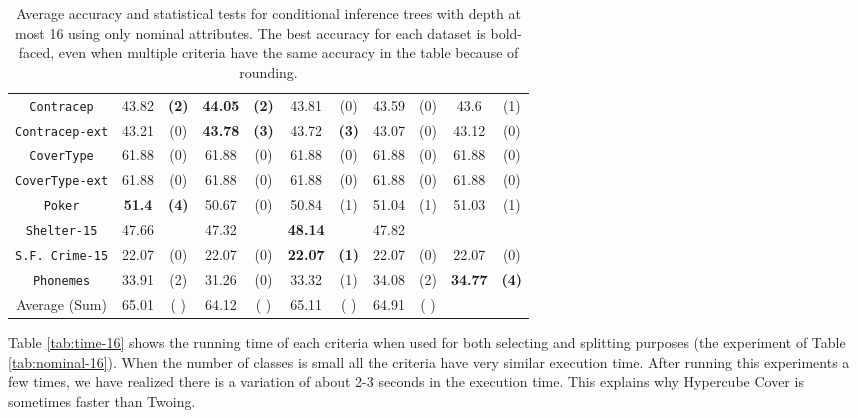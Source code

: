 \begin{table}
\begin{tabular}{c|cc|cc|cc|cc|cc}
{\tt Contracep}     & 43.82      &  {\bf (2)}        &   {\bf 44.05}& {\bf (2)}       &  43.81      &  (0)                 & 43.59       & (0)             & 43.6        & (1)         \\
{\tt Contracep-ext} & 43.21      &  (0)              &   {\bf 43.78}& {\bf (3)}       &  43.72      &  {\bf (3)}           & 43.07       & (0)             & 43.12       & (0)         \\
{\tt CoverType}     & 61.88      &  (0)              &   61.88      & (0)             &  61.88      &  (0)                 & 61.88       & (0)             & 61.88       & (0)         \\
{\tt CoverType-ext} & 61.88      &  (0)              &   61.88      & (0)             &  61.88      &  (0)                 & 61.88       & (0)             & 61.88       & (0)         \\
{\tt Poker}         & {\bf 51.4} &  {\bf (4)}        &   50.67      & (0)             &  50.84      &  (1)                 & 51.04       & (1)             & 51.03       & (1)         \\
{\tt Shelter-15}    & 47.66      &                   &   47.32      &                 & {\bf 48.14} &                      & 47.82       &                 &             &             \\
{\tt S.F. Crime-15} & 22.07      &  (0)              &   22.07      & (0)             & {\bf 22.07} &  {\bf (1)}           & 22.07       & (0)             & 22.07       & (0)         \\
{\tt Phonemes}      & 33.91      &  (2)              &   31.26      & (0)             &  33.32      &  (1)                 & 34.08       & (2)             & {\bf 34.77} & {\bf (4)}   \\
\hline
Average (Sum)       & 65.01      &  (  )             &   64.12      & (  )            &  65.11      &  (  )                & 64.91       & (  )            &             &
       \end{tabular}
        \caption{Average accuracy and statistical tests  for  conditional inference trees 
with depth at most 16 using only nominal attributes. The best accuracy for each dataset is bold-faced, even when multiple criteria have the same accuracy in the table because of rounding.}
\label{tab:ctree-16}
\normalsize
\end{table}


Table \ref{tab:time-16} shows the running time of each criteria when used for both selecting and splitting purposes (the experiment of Table \ref{tab:nominal-16}).
When the number of classes is small all the criteria have very similar execution time. After running this experiments a few times, we have realized there is a variation of about 2-3 seconds in the execution time. This explains why Hypercube Cover is sometimes faster than Twoing.

